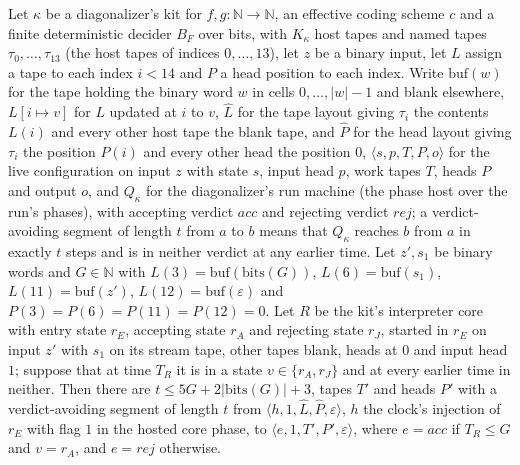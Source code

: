 \begin{theorem}
\label{Turing.NTimeDiag.dz_runR}
\leanok
{}
Let $\kappa$ be a diagonalizer's kit for $f, g : \mathbb{N} \to \mathbb{N}$, an effective coding scheme $c$ and a finite deterministic decider $B_F$ over bits, with $K_\kappa$ host tapes and named tapes $\tau_0, \dots, \tau_{13}$ (the host tapes of indices $0, \dots, 13$), let $z$ be a binary input, let $L$ assign a tape to each index $i < 14$ and $P$ a head position to each index. Write $\mathrm{buf}(w)$ for the tape holding the binary word $w$ in cells $0, \dots, |w| - 1$ and blank elsewhere, $L[i \mapsto v]$ for $L$ updated at $i$ to $v$, $\hat L$ for the tape layout giving $\tau_i$ the contents $L(i)$ and every other host tape the blank tape, and $\hat P$ for the head layout giving $\tau_i$ the position $P(i)$ and every other head the position $0$, $\langle s, p, T, P, o\rangle$ for the live configuration on input $z$ with state $s$, input head $p$, work tapes $T$, heads $P$ and output $o$, and $Q_\kappa$ for the diagonalizer's run machine (the phase host over the run's phases), with accepting verdict $\mathit{acc}$ and rejecting verdict $\mathit{rej}$; a verdict-avoiding segment of length $t$ from $a$ to $b$ means that $Q_\kappa$ reaches $b$ from $a$ in exactly $t$ steps and is in neither verdict at any earlier time. Let $z', s_1$ be binary words and $G \in \mathbb{N}$ with $L(3) = \mathrm{buf}(\mathrm{bits}(G))$, $L(6) = \mathrm{buf}(s_1)$, $L(11) = \mathrm{buf}(z')$, $L(12) = \mathrm{buf}(\varepsilon)$ and $P(3) = P(6) = P(11) = P(12) = 0$. Let $R$ be the kit's interpreter core with entry state $r_E$, accepting state $r_A$ and rejecting state $r_J$, started in $r_E$ on input $z'$ with $s_1$ on its stream tape, other tapes blank, heads at $0$ and input head $1$; suppose that at time $T_R$ it is in a state $v \in \{r_A, r_J\}$ and at every earlier time in neither. Then there are $t \le 5G + 2|\mathrm{bits}(G)| + 3$, tapes $T'$ and heads $P'$ with a verdict-avoiding segment of length $t$ from $\langle h, 1, \hat L, \hat P, \varepsilon\rangle$, $h$ the clock's injection of $r_E$ with flag $1$ in the hosted core phase, to $\langle e, 1, T', P', \varepsilon\rangle$, where $e = \mathit{acc}$ if $T_R \le G$ and $v = r_A$, and $e = \mathit{rej}$ otherwise.
\end{theorem}

